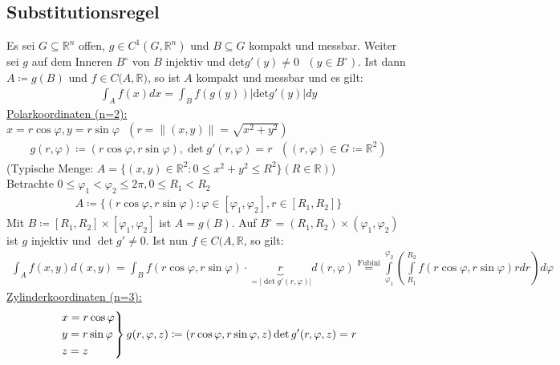 \documentclass{article}
\begin{document}
\subsection{Substitutionsregel}
\label{sec: Sub}
Es sei $G \subseteq \mathbb{R}^n$ offen, $g \in C^1(G,\mathbb{R}^n)$ und $B \subseteq G$ kompakt und messbar. Weiter sei $g$ auf dem Inneren $B^\circ$ von $B$ injektiv
und det$g'(y) \neq 0 \text{ } (y \in B^\circ)$. Ist dann $A \coloneqq g(B)$ und $f \in C(A,\mathbb{R)}$, so ist $A$ kompakt und messbar und es gilt:
\begin{align*}
    \int_A f(x) dx = \int_B f(g(y)) \lvert \text{det} g'(y)\rvert dy
\end{align*}
\underline{Polarkoordinaten (n=2):} \\
$x = r\cos \varphi, y = r\sin \varphi \text{ } (r = \lVert(x,y)\rVert = \sqrt{x^2 + y^2})$
\begin{align*}
    g(r,\varphi) \coloneqq (r\cos \varphi, r\sin \varphi), \det g'(r,\varphi) = r \text{ } ((r,\varphi) \in G \coloneqq \mathbb{R}^2)
\end{align*}
(Typische Menge: $A=\{ (x,y) \in \mathbb{R}^2: 0 \leq x^2+y^2\leq R^2\} (R \in \mathbb{R})$) \\
Betrachte $0 \leq \varphi_1 < \varphi_2 \leq 2\pi, 0 \leq R_1 < R_2$
\begin{align*}
    A \coloneqq \{ (r\cos \varphi, r\sin \varphi): \varphi \in [\varphi_1,\varphi_2], r \in [R_1,R_2]\}
\end{align*}
Mit $B \coloneqq [R_1,R_2] \times [\varphi_1, \varphi_2]$ ist $A = g(B)$. Auf $B^\circ = (R_1,R_2) \times (\varphi_1,\varphi_2)$ ist $g$ injektiv und $\det g' \neq 0$.
Ist nun $f \in C(A,\mathbb{R}$, so gilt: 
\begin{align*}
    \int_A f(x,y) d(x,y) = \int_B f(r \cos \varphi,r \sin \varphi) \cdot \underbrace{r}_{= \lvert \det g'(r,\varphi)\rvert} d(r, \varphi) \stackrel{\text{Fubini}}{=}
    \int \limits_{\varphi_1}^{\varphi_2} (\int \limits_{R_1}^{R_2} f(r \cos \varphi, r \sin \varphi)r dr) d\varphi
\end{align*}
\underline{Zylinderkoordinaten (n=3):} \\
\begin{align*}
    \begin{rcases} 
        x = r \cos \varphi \\
        y = r \sin \varphi \\
        z = z \\
    \end{rcases} g(r,\varphi,z) \coloneqq (r \cos \varphi,r \sin \varphi, z) \det g'(r,\varphi,z) = r
\end{align*}
\end{document}

